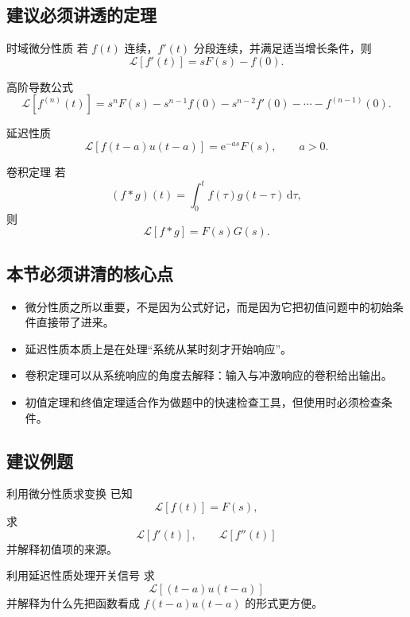 \subsection*{建议必须讲透的定理}
\begin{dingli}{时域微分性质}{}
若 $f(t)$ 连续，$f'(t)$ 分段连续，并满足适当增长条件，则
\[
    \mathcal{L}[f'(t)] = sF(s)-f(0).
\]
\end{dingli}

\begin{dingli}{高阶导数公式}{}
\[
    \mathcal{L}[f^{(n)}(t)]
    =
    s^nF(s)-s^{n-1}f(0)-s^{n-2}f'(0)-\cdots-f^{(n-1)}(0).
\]
\end{dingli}

\begin{dingli}{延迟性质}{}
\[
    \mathcal{L}[f(t-a)u(t-a)]
    =
    \mathrm{e}^{-as}F(s),
    \qquad a>0.
\]
\end{dingli}

\begin{dingli}{卷积定理}{}
若
\[
    (f*g)(t)=\int_0^t f(\tau)g(t-\tau)\,\mathrm{d}\tau,
\]
则
\[
    \mathcal{L}[f*g]=F(s)G(s).
\]
\end{dingli}

\subsection*{本节必须讲清的核心点}
\begin{itemize}
    \item 微分性质之所以重要，不是因为公式好记，而是因为它把初值问题中的初始条件直接带了进来。
    \item 延迟性质本质上是在处理``系统从某时刻才开始响应''。
    \item 卷积定理可以从系统响应的角度去解释：输入与冲激响应的卷积给出输出。
    \item 初值定理和终值定理适合作为做题中的快速检查工具，但使用时必须检查条件。
\end{itemize}

\subsection*{建议例题}
\begin{lizi}{利用微分性质求变换}{}
已知
\[
    \mathcal{L}[f(t)]=F(s),
\]
求
\[
    \mathcal{L}[f'(t)],\qquad \mathcal{L}[f''(t)]
\]
并解释初值项的来源。
\end{lizi}

\begin{lizi}{利用延迟性质处理开关信号}{}
求
\[
    \mathcal{L}[(t-a)u(t-a)]
\]
并解释为什么先把函数看成 $f(t-a)u(t-a)$ 的形式更方便。
\end{lizi}

